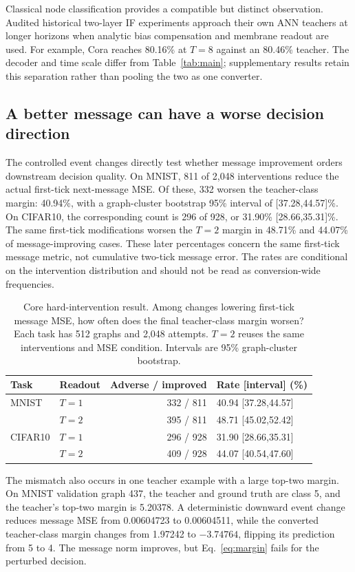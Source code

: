 \documentclass[10pt,twocolumn,letterpaper]{article}
\begin{document}
Classical node classification provides a compatible but distinct observation. Audited historical two-layer IF experiments approach their own ANN teachers at longer horizons when analytic bias compensation and membrane readout are used. For example, Cora reaches 80.16\% at $T=8$ against an 80.46\% teacher. The decoder and time scale differ from Table~\ref{tab:main}; supplementary results retain this separation rather than pooling the two as one converter.

\subsection{A better message can have a worse decision direction}
The controlled event changes directly test whether message improvement orders downstream decision quality. On MNIST, 811 of 2,048 interventions reduce the actual first-tick next-message MSE. Of these, 332 worsen the teacher-class margin: 40.94\%, with a graph-cluster bootstrap 95\% interval of [37.28,44.57]\%. On CIFAR10, the corresponding count is 296 of 928, or 31.90\% [28.66,35.31]\%. The same first-tick modifications worsen the $T=2$ margin in 48.71\% and 44.07\% of message-improving cases. These later percentages concern the same first-tick message metric, not cumulative two-tick message error. The rates are conditional on the intervention distribution and should not be read as conversion-wide frequencies.

\begin{table}[t]
\caption{Core hard-intervention result. Among changes lowering first-tick message MSE, how often does the final teacher-class margin worsen? Each task has 512 graphs and 2,048 attempts. $T=2$ reuses the same interventions and MSE condition. Intervals are 95\% graph-cluster bootstrap.}
\label{tab:hard}\centering\small\setlength{\tabcolsep}{3pt}
\begin{tabular}{llrl}\toprule
Task & Readout & Adverse / improved & Rate [interval] (\%)\\\midrule
MNIST & $T=1$ & 332 / 811 & 40.94 [37.28,44.57]\\
 & $T=2$ & 395 / 811 & 48.71 [45.02,52.42]\\
CIFAR10 & $T=1$ & 296 / 928 & 31.90 [28.66,35.31]\\
 & $T=2$ & 409 / 928 & 44.07 [40.54,47.60]\\\bottomrule
\end{tabular}\end{table}

The mismatch also occurs in one teacher example with a large top-two margin. On MNIST validation graph 437, the teacher and ground truth are class 5, and the teacher's top-two margin is 5.20378. A deterministic downward event change reduces message MSE from 0.00604723 to 0.00604511, while the converted teacher-class margin changes from 1.97242 to $-3.74764$, flipping its prediction from 5 to 4. The message norm improves, but Eq.~\eqref{eq:margin} fails for the perturbed decision.
\end{document}
